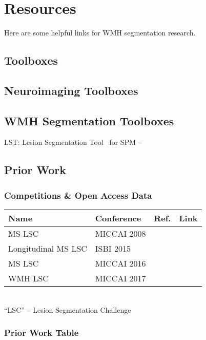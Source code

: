 \chapter{Resources}
Here are some helpful links for WMH segmentation research.
\section{Toolboxes}

\section{Neuroimaging Toolboxes}

\section{WMH Segmentation Toolboxes}
LST: Lesion Segmentation Tool~\cite{Schmidt2012,Schmidt2015} for SPM
-- 

\section{Prior Work}
\subsection{Competitions \& Open Access Data}
\begin{tabu} to \textwidth {llcl}
	\toprule
	Name                & Conference  &        Ref.         & Link                                                     \\ \midrule
	MS LSC              & MICCAI 2008 & ~\cite{MSSEG2008}~  &                     \\
	Longitudinal MS LSC & ISBI 2015   & ~\cite{MSISBI2015}~ &    \\
	MS LSC              & MICCAI 2016 & ~\cite{MSSEG2016}~  &  \\
	WMH LSC             & MICCAI 2017 & ~\cite{WMHSEG2017}~ &                            \\ \bottomrule
\end{tabu}\\
``LSC'' -- Lesion Segmentation Challenge
\subsection{Prior Work Table}

